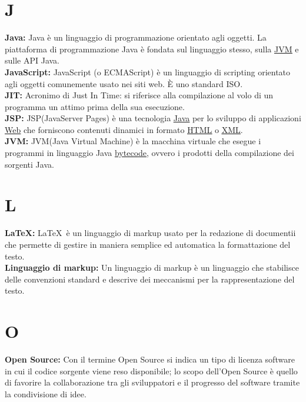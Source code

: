 \section*{J}
\hypertarget{java}{}
\textbf{Java:}
Java \`e un linguaggio di programmazione orientato agli oggetti. La piattaforma di programmazione Java \`e fondata sul linguaggio stesso, sulla \hyperlink{jvm}{\underline{JVM}} e sulle API Java.\\

\hypertarget{javascript}{}
\textbf{JavaScript:}
JavaScript (o ECMAScript) \`e un linguaggio di scripting orientato agli oggetti comunemente usato nei siti web. \`E  uno standard ISO.\\

\hypertarget{JIT}{}
\textbf{JIT:}
Acronimo di Just In Time: si riferisce alla compilazione al volo di un programma un attimo prima della sua esecuzione.\\

\hypertarget{jsp}{}
\textbf{JSP:}
JSP(JavaServer Pages) \`e una tecnologia \hyperlink{java}{\underline{Java}} per lo sviluppo di applicazioni \hyperlink{web}{\underline{Web}} che forniscono contenuti dinamici in formato \hyperlink{html}{\underline{HTML}} o \hyperlink{xml}{\underline{XML}}.\\

\hypertarget{jvm}{}
\textbf{JVM:}
JVM(Java Virtual Machine) \`e la macchina virtuale che esegue i programmi in linguaggio Java \hyperlink{bytecode}{\underline{bytecode}}, ovvero i prodotti della compilazione dei sorgenti Java.\\

\section*{L}
\hypertarget{latex}{}
\textbf{\LaTeX:}
\LaTeX \ \`e un linguaggio di markup usato per la redazione di documentii che permette di gestire in maniera semplice ed automatica la formattazione del testo.\\

\textbf{Linguaggio di markup:}
\hypertarget{markup}{}
Un linguaggio di markup \`e un linguaggio che stabilisce delle convenzioni standard e descrive dei meccanismi per la rappresentazione del testo.\\

\section*{O}
\hypertarget{opensource}{}
\textbf{Open Source:}
Con il termine Open Source si indica un tipo di licenza software in cui il codice sorgente viene reso disponibile; lo scopo dell'Open Source \`e quello di favorire la collaborazione tra gli sviluppatori e il progresso del software tramite la condivisione di idee.\\


